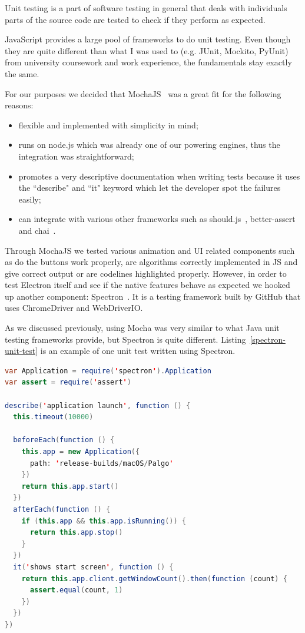 \documentclass{l4proj}
\begin{document}
Unit testing is a part of software testing in general that deals with individuals parts of the source code are tested
to check if they perform as expected.

JavaScript provides a large pool of frameworks to do unit testing. Even though they are quite different than what I was
used to (e.g. JUnit, Mockito, PyUnit) from university coursework and work experience, the fundamentals stay exactly the
same.

For our purposes we decided that MochaJS~\cite{mocha} was a great fit for the following reasons:

\begin{itemize}
  \item flexible and implemented with simplicity in mind;
  \item runs on node.js which was already one of our powering engines, thus the integration was straightforward;
  \item promotes a very descriptive documentation when writing tests because it uses the ``describe" and ``it" keyword
    which let the developer spot the failures easily;
  \item can integrate with various other frameworks such as should.js~\cite{shouldjs},
    better-assert~\cite{better-assert} and chai~\cite{chai}.
\end{itemize}

Through MochaJS we tested various animation and UI related components such as do the buttons work properly, are
algorithms correctly implemented in JS and give correct output or are codelines highlighted properly. However, in
order to test Electron itself and see if the native features behave as expected we hooked up another component:
Spectron~\cite{spectron}. It is a testing framework built by GitHub that uses ChromeDriver and WebDriverIO. 

As we discussed previously, using Mocha was very similar to what Java unit testing frameworks provide, but Spectron is
quite different. Listing~\ref{spectron-unit-test} is an example of one unit test written using Spectron.

\pagebreak

\begin{lstlisting}[language={Java}, label={spectron-unit-test}, caption={Spectron unit test which checks correct behaviour of the Electron
window.}]
var Application = require('spectron').Application
var assert = require('assert')

describe('application launch', function () {
  this.timeout(10000)

  beforeEach(function () {
    this.app = new Application({
      path: 'release-builds/macOS/Palgo'
    })
    return this.app.start()
  })
  afterEach(function () {
    if (this.app && this.app.isRunning()) {
      return this.app.stop()
    }
  })
  it('shows start screen', function () {
    return this.app.client.getWindowCount().then(function (count) {
      assert.equal(count, 1)
    })
  })
})
\end{lstlisting}
\end{document}
